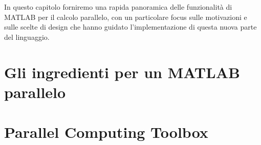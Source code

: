 \documentclass[
	a4paper,
	twoside,
	12pt
]{book}
\theoremstyle{StileEsempio}
\begin{document}
In questo capitolo forniremo una rapida panoramica delle funzionalit\`a di MATLAB per il calcolo parallelo,
con un particolare focus sulle motivazioni e sulle scelte di design che hanno guidato l'implementazione di questa nuova parte del linguaggio.
\section{Gli ingredienti per un MATLAB parallelo}
\label{par2.1}

\section{Parallel Computing Toolbox}
\label{par2.2}

\backmatter

%
\printbibliography
{}
%
\end{document}
